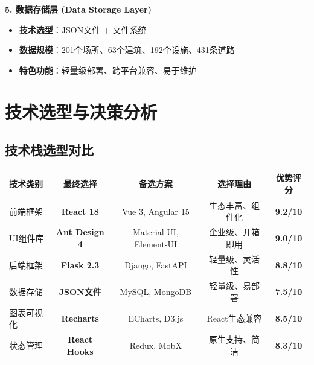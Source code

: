 \documentclass[12pt,a4paper]{article}
\begin{document}
\textbf{5. 数据存储层 (Data Storage Layer)}
\begin{itemize}
    \item \textbf{技术选型}：JSON文件 + 文件系统
    \item \textbf{数据规模}：201个场所、63个建筑、192个设施、431条道路
    \item \textbf{特色功能}：轻量级部署、跨平台兼容、易于维护
\end{itemize}

\section{技术选型与决策分析}

\subsection{技术栈选型对比}

\begin{table}[H]
\centering
\begin{tcolorbox}[
    colback=light,
    colframe=primary,
    title={\textbf{核心技术选型对比分析}},
    coltitle=white,
    colbacktitle=primary,
    fonttitle=\bfseries,
    rounded corners=5pt,
    width=0.95\textwidth
]
\begin{tabular}{lcccc}
\toprule
\rowcolor{secondary!20}
\textbf{技术类别} & \textbf{最终选择} & \textbf{备选方案} & \textbf{选择理由} & \textbf{优势评分} \\
\midrule
前端框架 & \textcolor{success}{\textbf{React 18}} & Vue 3, Angular 15 & 生态丰富、组件化 & \textcolor{success}{\textbf{9.2/10}} \\
\rowcolor{light}
UI组件库 & \textcolor{success}{\textbf{Ant Design 4}} & Material-UI, Element-UI & 企业级、开箱即用 & \textcolor{success}{\textbf{9.0/10}} \\
后端框架 & \textcolor{success}{\textbf{Flask 2.3}} & Django, FastAPI & 轻量级、灵活性 & \textcolor{success}{\textbf{8.8/10}} \\
\rowcolor{light}
数据存储 & \textcolor{warning}{\textbf{JSON文件}} & MySQL, MongoDB & 轻量级、易部署 & \textcolor{warning}{\textbf{7.5/10}} \\
图表可视化 & \textcolor{success}{\textbf{Recharts}} & ECharts, D3.js & React生态兼容 & \textcolor{success}{\textbf{8.5/10}} \\
\rowcolor{light}
状态管理 & \textcolor{success}{\textbf{React Hooks}} & Redux, MobX & 原生支持、简洁 & \textcolor{success}{\textbf{8.3/10}} \\
\bottomrule
\end{tabular}
\end{tcolorbox}
\end{table}
\end{document}
